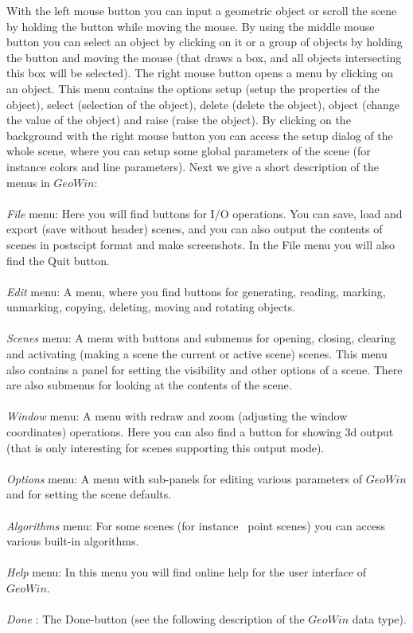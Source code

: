 With the left mouse button you can input a geometric object or scroll the scene by holding the
button while moving the mouse. By using the middle mouse button you can select an object by
clicking on it or a group of objects by holding the button and moving the mouse (that draws a
box, and all objects intersecting this box will be selected). The right mouse button opens a
menu by clicking on an object. This menu contains the options setup (setup the properties of the
object), select (selection of the object), delete (delete the object), 
object (change the value of the object) and raise (raise the object). By clicking on
the background with the right mouse button you can access the setup dialog of the whole scene,
where you can setup some global parameters of the scene (for instance colors and line parameters).
Next we give a short description of the menus in $GeoWin$:
\\
\\
{\em File} menu:
Here you will find buttons for I/O operations. You can save, load and export (save without header) scenes,
and you can also output the contents of scenes in postscipt format and make screenshots.
In the File menu you will also find the Quit button.
\\
\\
{\em Edit} menu:
A menu, where you find buttons for generating, reading, marking, unmarking, copying, deleting, moving
and rotating objects.
\\
\\
{\em Scenes} menu:
A menu with buttons and submenus for opening, closing, clearing and activating (making a scene the current or
active scene) scenes. This menu also contains a panel for setting the visibility and other options of a scene.
There are also submenus for looking at the contents of the scene.
\\
\\
{\em Window} menu:
A menu with redraw and zoom (adjusting the window coordinates) operations. Here you can also find a button for
showing 3d output (that is only interesting for scenes supporting this output mode).
\\
\\
{\em Options} menu:
A menu with sub-panels for editing various parameters of $GeoWin$ and for setting the scene defaults.
\\
\\
{\em Algorithms} menu:
For some scenes (for instance \leda\ point scenes) you can access various built-in algorithms.
\\
\\
{\em Help} menu:
In this menu you will find online help for the user interface of $GeoWin$.
\\
\\
{\em Done} :
The Done-button (see the following description of the $GeoWin$ data type).

